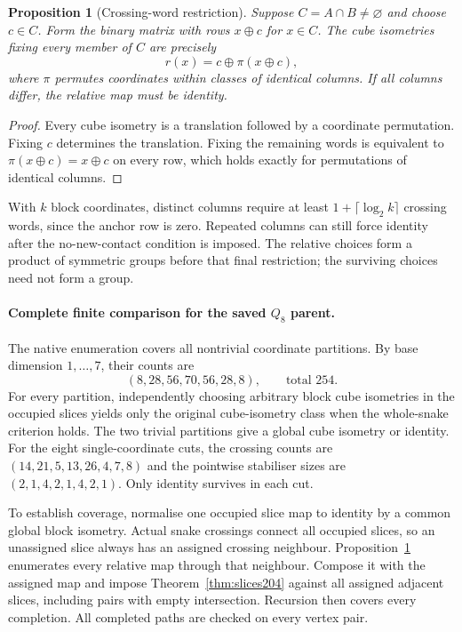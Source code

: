 \documentclass[11pt,a4paper]{article}
\newtheorem{proposition}[theorem]{Proposition}
\theoremstyle{definition}
\theoremstyle{remark}
\begin{document}
\begin{proposition}[Crossing-word restriction]
\label{prop:columns204}
Suppose $C=A\cap B\ne\varnothing$ and choose $c\in C$. Form the
binary matrix with rows $x\oplus c$ for $x\in C$. The cube isometries
fixing every member of $C$ are precisely
\[
r(x)=c\oplus\pi(x\oplus c),
\]
where $\pi$ permutes coordinates within classes of identical columns.
If all columns differ, the relative map must be identity.
\end{proposition}
\begin{proof}
Every cube isometry is a translation followed by a coordinate
permutation. Fixing $c$ determines the translation. Fixing the
remaining words is equivalent to $\pi(x\oplus c)=x\oplus c$ on
every row, which holds exactly for permutations of identical columns.
\end{proof}

With $k$ block coordinates, distinct columns require at least
$1+\lceil\log_2 k\rceil$ crossing words, since the anchor row is
zero. Repeated columns can still force identity after the
no-new-contact condition is imposed. The relative choices form a
product of symmetric groups before that final restriction; the
surviving choices need not form a group.

\paragraph{Complete finite comparison for the saved $Q_8$ parent.}
The native enumeration covers all nontrivial coordinate partitions.
By base dimension $1,\ldots,7$, their counts are
\[
(8,28,56,70,56,28,8),\qquad\text{total }254.
\]
For every partition, independently choosing arbitrary block cube
isometries in the occupied slices yields only the original
cube-isometry class when the whole-snake criterion holds. The two
trivial partitions give a global cube isometry or identity.
For the eight single-coordinate cuts, the crossing counts are
$(14,21,5,13,26,4,7,8)$ and the pointwise stabiliser sizes are
$(2,1,4,2,1,4,2,1)$. Only identity survives in each cut.

To establish coverage, normalise one occupied slice map to identity
by a common global block isometry. Actual snake crossings connect
all occupied slices, so an unassigned slice always has an assigned
crossing neighbour. Proposition~\ref{prop:columns204} enumerates
every relative map through that neighbour. Compose it with the
assigned map and impose Theorem~\ref{thm:slices204} against all
assigned adjacent slices, including pairs with empty intersection.
Recursion then covers every completion. All completed paths are
checked on every vertex pair.
\end{document}
